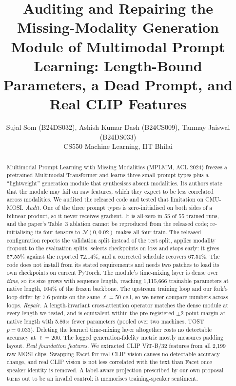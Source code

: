 \documentclass[lettersize,journal]{IEEEtran}
\begin{document}
\title{Auditing and Repairing the Missing-Modality Generation Module of Multimodal Prompt Learning: Length-Bound Parameters, a Dead Prompt, and Real CLIP Features}

\author{Sujal Som (B24DS032), Ashish Kumar Dash (B24CS009), Tanmay Jaiswal (B24DS033)\\
CS550 Machine Learning, IIT Bhilai}

\maketitle

\begin{abstract}
Multimodal Prompt Learning with Missing Modalities (MPLMM, ACL 2024) freezes a pretrained Multimodal Transformer and learns three small prompt types plus a ``lightweight'' generation module that synthesises absent modalities. Its authors state that the module may fail on raw features, which they expect to be less correlated across modalities. We audited the released code and tested that limitation on CMU-MOSI.
\emph{Audit.} One of the three prompt types is zero-initialised on both sides of a bilinear product, so it never receives gradient. It is all-zero in 55 of 55 trained runs, and the paper's Table~3 ablation cannot be reproduced from the released code; re-initialising its four tensors to $\mathcal{N}(0,0.02)$ makes all four train. The released configuration reports the validation split instead of the test split, applies modality dropout to the evaluation splits, selects checkpoints on loss and stops early: it gives 57.55\% against the reported 72.14\%, and a corrected schedule recovers 67.51\%. The code does not install from its stated requirements and needs two patches to load its own checkpoints on current PyTorch. The module's time-mixing layer is dense over \emph{time}, so its size grows with sequence length, reaching 1,115,666 trainable parameters at native length, 104\% of the frozen backbone. The upstream training loop and our fork's loop differ by 7.6 points on the same $\ell=50$ cell, so we never compare numbers across loops.
\emph{Repair.} A length-invariant cross-attention operator matches the dense module at every length we tested, and is equivalent within the pre-registered $\pm$2-point margin at native length with 5.86$\times$ fewer parameters (pooled over two machines, TOST $p=0.033$). Deleting the learned time-mixing layer altogether costs no detectable accuracy at $\ell=200$. The logged generation-fidelity metric mostly measures padding layout.
\emph{Real foundation features.} We extracted CLIP ViT-B/32 features from all 2,199 raw MOSI clips. Swapping Facet for real CLIP vision causes no detectable accuracy change, and real CLIP vision is not less correlated with the text than Facet once speaker identity is removed. A label-aware projection prescribed by our own proposal turns out to be an invalid control: it memorises training-speaker sentiment.
\end{abstract}
\end{document}
